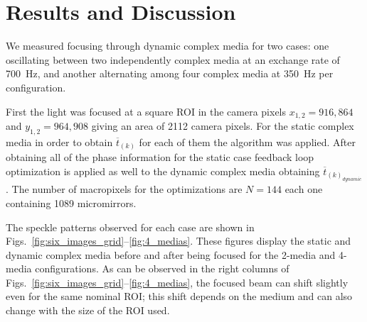 \documentclass[11pt, twoside]{article}
\begin{document}
\section{Results and Discussion}
\label{sec:results}

We measured focusing through dynamic complex media for two cases: one oscillating between two independently complex media at an exchange rate of \SI{700}{\hertz}, and another alternating among four complex media at \SI{350}{\hertz} per configuration.

First the light was focused at a square ROI in the camera pixels $x_{1,2} = 916, 864$ and $y_{1,2} = 964, 908$ giving an area of 2112 camera pixels. For the static complex media in order to obtain $\overline{t}_{(k)}$ for each of them the algorithm was applied. After obtaining all of the phase information for the static case feedback loop optimization is applied as well to the dynamic complex media obtaining $\overline{t}_{(k)_{dynamic}}$. The number of macropixels for the optimizations are $N = 144$ each one containing 1089 micromirrors.

The speckle patterns observed for each case are shown in Figs.~\ref{fig:six_images_grid}--\ref{fig:4_medias}. These figures display the static and dynamic complex media before and after being focused for the 2-media and 4-media configurations. As can be observed in the right columns of Figs.~\ref{fig:six_images_grid}--\ref{fig:4_medias}, the focused beam can shift slightly even for the same nominal ROI; this shift depends on the medium and can also change with the size of the ROI used.
\end{document}
